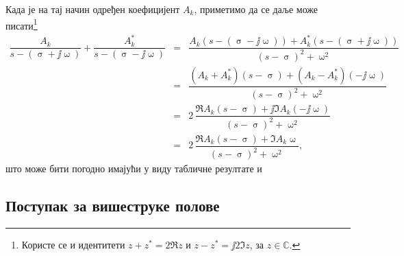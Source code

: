 \begin{center}
    \end{center}

Када је на тај начин одређен  коефицијент $A_k$, приметимо да се даље може писати\footnote{Користе се и идентитети 
$z + z^* = 2\Re{z}$ и 
$z - z^* = \jj 2 \Im{z}$, за $z \in \mathbb C$. }
\begin{eqnarray}
    \dfrac{A_k}{s-(\upsigma + \jj\upomega)}  + 
    \dfrac{A_k^*}{s-(\upsigma - \jj\upomega)}  
    &=&  
    \dfrac{ A_k(s-(\upsigma - \jj\upomega)) + A_k^* (s-(\upsigma + \jj\upomega))}{(s-\upsigma)^2 + \upomega^2}  
    \\ 
    &=&
    \dfrac{ (A_k + A_k^*) (s - \upsigma) + (A_k - A_k^*) (-\jj\upomega)   }{(s-\upsigma)^2 + \upomega^2}     
    \\
    &=&
    2\,\dfrac{ \Re{A_k} (s - \upsigma) + \jj \Im{A_k} (-\jj\upomega)   }{(s-\upsigma)^2 + \upomega^2}     
    \\
    &=&
    2\,\dfrac{ \Re{A_k} (s - \upsigma) + \Im{A_k} \upomega   }{(s-\upsigma)^2 + \upomega^2},    
\end{eqnarray}
што може бити погодно имајући у виду табличне резултате  и 

\subsection{Поступак за вишеструке полове}


